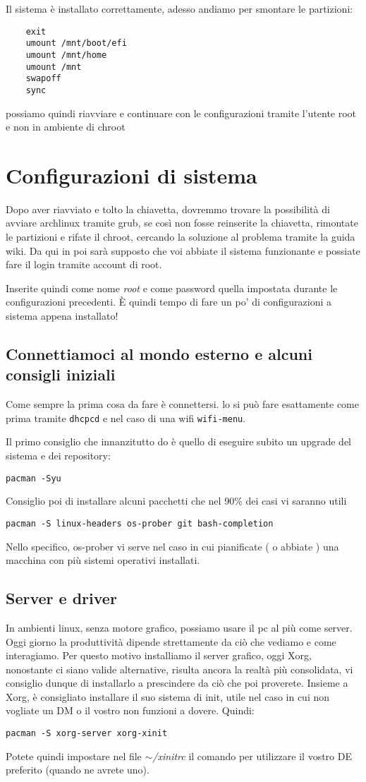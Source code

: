 \documentclass[twoside,italian]{book}
\newcommand{\code}[1]{\texttt{#1}}
\newcommand{\centcode}[1]{

\definecolor{codice}{rgb}{0.5,0.1,0.1}

	\begin{center}
		\color{codice}
		\code{#1}
	\end{center}


}
\begin{document}
			Il sistema è installato correttamente, adesso andiamo per smontare le partizioni:
\begin{lstlisting}
	exit
	umount /mnt/boot/efi
	umount /mnt/home
	umount /mnt
	swapoff
	sync
\end{lstlisting}

			possiamo quindi riavviare e continuare con le configurazioni tramite l'utente root e non in ambiente di chroot

	\chapter{Configurazioni di sistema}

		Dopo aver riavviato e tolto la chiavetta, dovremmo trovare la possibilità di avviare archlinux tramite grub, se così non fosse reinserite la chiavetta, rimontate le partizioni e rifate il chroot, cercando la soluzione al problema tramite la guida wiki.
		Da qui in poi sarà supposto che voi abbiate il sistema funzionante e possiate fare il login tramite account di root.

		Inserite quindi come nome \textit{root} e come password quella impostata durante le configurazioni precedenti. È quindi tempo di fare un po' di configurazioni a sistema appena installato!

		\section{Connettiamoci al mondo esterno e alcuni consigli iniziali}

			Come sempre la prima cosa da fare è connettersi. lo si può fare esattamente come prima tramite \code{dhcpcd} e nel caso di una wifi \code{wifi-menu}.

			Il primo consiglio che innanzitutto do è quello di eseguire subito un upgrade del sistema e dei repository:\centcode{pacman -Syu}
			Consiglio poi di installare alcuni pacchetti che nel 90\% dei casi vi saranno utili\centcode{pacman -S linux-headers os-prober git bash-completion}Nello specifico, os-prober vi serve nel caso in cui pianificate ( o abbiate ) una macchina con più sistemi operativi installati.

		\section{Server e driver}

			In ambienti linux, senza motore grafico, possiamo usare il pc al più come server. Oggi giorno la produttività dipende strettamente da ciò che vediamo e come interagiamo. Per questo motivo installiamo il server grafico, oggi Xorg, nonostante ci siano valide alternative, risulta ancora la realtà più consolidata, vi consiglio dunque di installarlo a prescindere da ciò che poi proverete. Insieme a Xorg, è consigliato installare il suo sistema di init, utile nel caso in cui non vogliate un DM o il vostro non funzioni a dovere. Quindi:\centcode{pacman -S xorg-server xorg-xinit}
			Potete quindi impostare nel file \textit{$\sim$/xinitrc} il comando per utilizzare  il vostro DE preferito (quando ne avrete uno).
\end{document}
